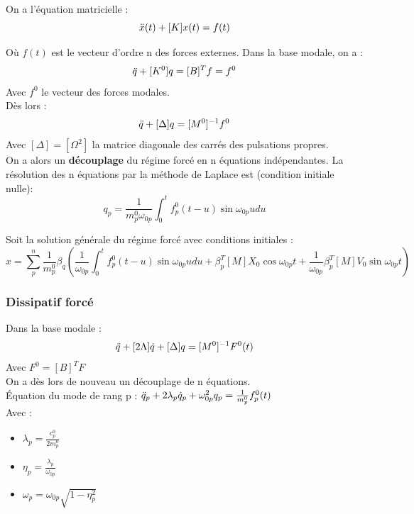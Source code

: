\documentclass[../main.tex]{subfiles}
\begin{document}
On a l'équation matricielle : \begin{equation}
    [M]\Ddot{x}(t) + [K] x(t) = f(t)
\end{equation}

Où $f(t)$ est le vecteur d'ordre n des forces externes. Dans la base modale, on a : \begin{equation}
    [M^0] \Ddot{q} + [K^0] q = [B]^T f = f^0
\end{equation}
Avec $f^0$ le vecteur des forces modales.\\

Dès lors : \begin{equation}
    \Ddot{q} + [\Delta] q = [M^0]^{-1} f^0
\end{equation}
Avec $[\Delta] = [\Omega^2]$ la matrice diagonale des carrés des pulsations propres.\\
On a alors un \textbf{découplage} du régime forcé en n équations indépendantes. La résolution des n équations par la méthode de Laplace est (condition initiale nulle): \begin{equation}
    q_p = \frac{1}{m^0_p \omega_{0p}} \int_0^t f_p^0 (t-u) \sin\omega_{0p}udu
\end{equation}

Soit la solution générale du régime forcé avec conditions initiales : \begin{equation}
    x = \sum_p^n \frac{1}{m_p^0} \beta_q (\frac{1}{\omega_{0p}} \int_0^t f_p^0(t-u)\sin \omega_{0p} u du + \beta_p^T [M] X_0 \cos \omega_{0p} t + \frac{1}{\omega_{0p}} \beta_p^T [M] V_0 \sin\omega_{0p}t)
\end{equation}

\subsubsection{Dissipatif forcé}
Dans la base modale : \begin{equation}
    \Ddot{q} + [2\Lambda] \dot{q} + [\Delta] q = [M^0]^{-1} F^0(t)
\end{equation}
Avec $F^0 = [B]^T F$\\

On a dès lors de nouveau un découplage de n équations.\\
Équation du mode de rang p : $\Ddot{q}_p + 2 \lambda_p \dot{q}_p + \omega_{0p}^2 q_p = \frac{1}{m_p^0} f_p^0(t)$\\
Avec : \begin{itemize}
    \item $\lambda_p = \frac{c_p^0}{2m_p^0}$\\
    \item $\eta_p = \frac{\lambda_p}{\omega_{0p}}$\\
    \item $\omega_p = \omega_{0p} \sqrt{1-\eta_p^2}$\\
\end{itemize}
\end{document}
